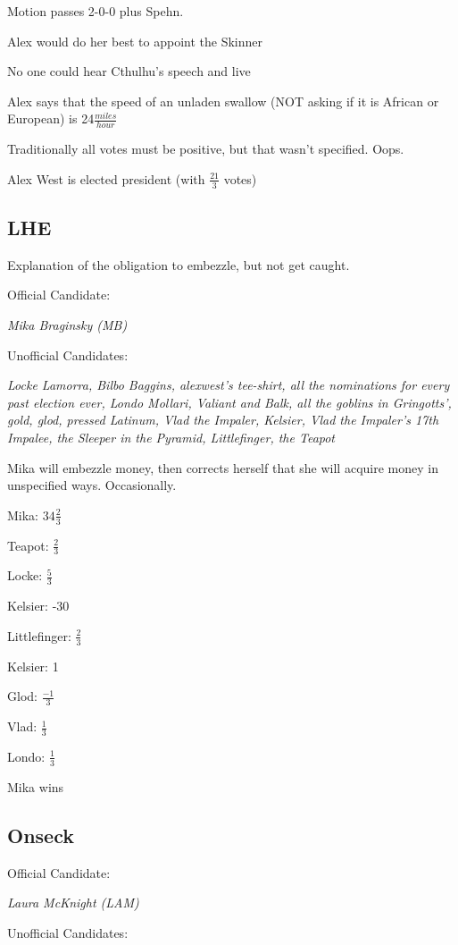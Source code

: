 \documentclass[10pt]{article}
\newcommand{\ps}{ plus Spehn\xspace}
\begin{document}
Motion passes 2-0-0\ps.

Alex would do her best to appoint the Skinner

No one could hear Cthulhu's speech and live

Alex says that the speed of an unladen swallow 
(NOT asking if it is African or European) is 24$\frac{miles}{hour}$

Traditionally all votes must be positive, but that wasn't specified. Oops.

Alex West is elected president (with $\frac{21}{3}$ votes)

\subsection*{LHE}

Explanation of the obligation to embezzle, but not get caught.

Official Candidate:

\emph{Mika Braginsky (MB)}

Unofficial Candidates:

\emph{Locke Lamorra, Bilbo Baggins, alexwest's tee-shirt, all the nominations for every past election ever, Londo Mollari, Valiant and Balk, all the goblins in Gringotts', gold, glod, pressed Latinum, Vlad the Impaler, Kelsier, Vlad the Impaler's 17th Impalee, the Sleeper in the Pyramid, Littlefinger, the Teapot}

Mika will embezzle money, then corrects herself that she will acquire money 
in unspecified ways. Occasionally.

Mika: $34\frac{2}{3}$

Teapot: $\frac{2}{3}$

Locke: $\frac{5}{3}$

Kelsier: -30

Littlefinger: $\frac{2}{3}$

Kelsier: 1

Glod: $\frac{-1}{3}$

Vlad: $\frac{1}{3}$

Londo: $\frac{1}{3}$

Mika wins


\subsection*{Onseck}

Official Candidate: 

\emph{Laura McKnight (LAM)}

Unofficial Candidates:
\end{document}
